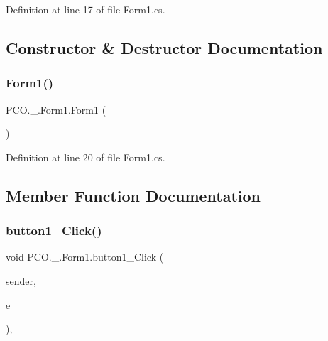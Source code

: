 Definition at line 17 of file Form1.\+cs.



\subsection{Constructor \& Destructor Documentation}
\mbox{\label{classPCO_1_1__0_1_1Form1_a70fd4d599a7d0db69c4ffd802816ebeb}} 
\subsubsection{\texorpdfstring{Form1()}{Form1()}}
{\footnotesize\ttfamily P\+C\+O.\+\_.\+Form1.\+Form1 (\begin{DoxyParamCaption}{ }\end{DoxyParamCaption})\hspace{0.3cm}{\ttfamily [inline]}}



Definition at line 20 of file Form1.\+cs.



\subsection{Member Function Documentation}
\mbox{\label{classPCO_1_1__0_1_1Form1_a9c714d75d45575cd760778906b458a75}} 
\subsubsection{\texorpdfstring{button1\+\_\+\+Click()}{button1\_Click()}}
{\footnotesize\ttfamily void P\+C\+O.\+\_.\+Form1.\+button1\+\_\+\+Click (\begin{DoxyParamCaption}\item[{object}]{sender,  }\item[{Event\+Args}]{e }\end{DoxyParamCaption})\hspace{0.3cm}{\ttfamily [inline]}, {\ttfamily [private]}}



